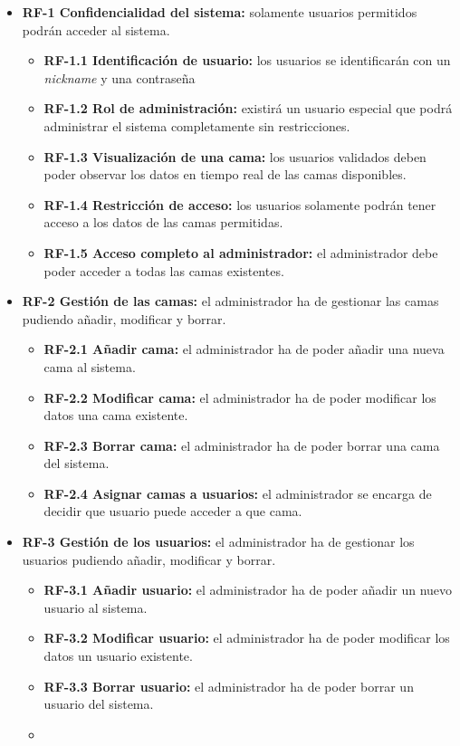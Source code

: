 \begin{itemize}
\tightlist
\item
\textbf{RF-1 Confidencialidad del sistema:} solamente usuarios permitidos podrán acceder al sistema.
	\begin{itemize}
		\tightlist
		\item
		\textbf{RF-1.1 Identificación de usuario:} los usuarios se identificarán con un \textit{nickname} y una contraseña 
		\item
		\textbf{RF-1.2 Rol de administración:} existirá un usuario especial que podrá administrar el sistema completamente sin restricciones.
		\item 
		\textbf{RF-1.3 Visualización de una cama:} los usuarios validados deben poder observar los datos en tiempo real de las camas disponibles. 
		\item
		\textbf{RF-1.4 Restricción de acceso:} los usuarios solamente podrán tener acceso a los datos de las camas permitidas. 
		\item
		\textbf{RF-1.5 Acceso completo al administrador:} el administrador debe poder acceder a todas las camas existentes. 
	\end{itemize}	
\item
\textbf{RF-2 Gestión de las camas:} el administrador ha de gestionar las camas pudiendo añadir, modificar y borrar.
	\begin{itemize}
		\tightlist
		\item
		\textbf{RF-2.1 Añadir cama:} el administrador ha de poder añadir una nueva cama al sistema.
		\item
		\textbf{RF-2.2 Modificar cama:} el administrador ha de poder modificar los datos una cama existente.
		\item
		\textbf{RF-2.3 Borrar cama:} el administrador ha de poder borrar una cama del sistema.
		\item
		\textbf{RF-2.4 Asignar camas a usuarios:} el administrador se encarga de decidir que usuario puede acceder a que cama.
	\end{itemize}
\item
\textbf{RF-3 Gestión de los usuarios:} el administrador ha de gestionar los usuarios pudiendo añadir, modificar y borrar.
	\begin{itemize}
		\tightlist
		\item
		\textbf{RF-3.1 Añadir usuario:} el administrador ha de poder añadir un nuevo usuario al sistema.
		\item
		\textbf{RF-3.2 Modificar usuario:} el administrador ha de poder modificar los datos un usuario existente.
		\item
		\textbf{RF-3.3 Borrar usuario:} el administrador ha de poder borrar un usuario del sistema.
		\item
	\end{itemize}
\end{itemize}	
	

